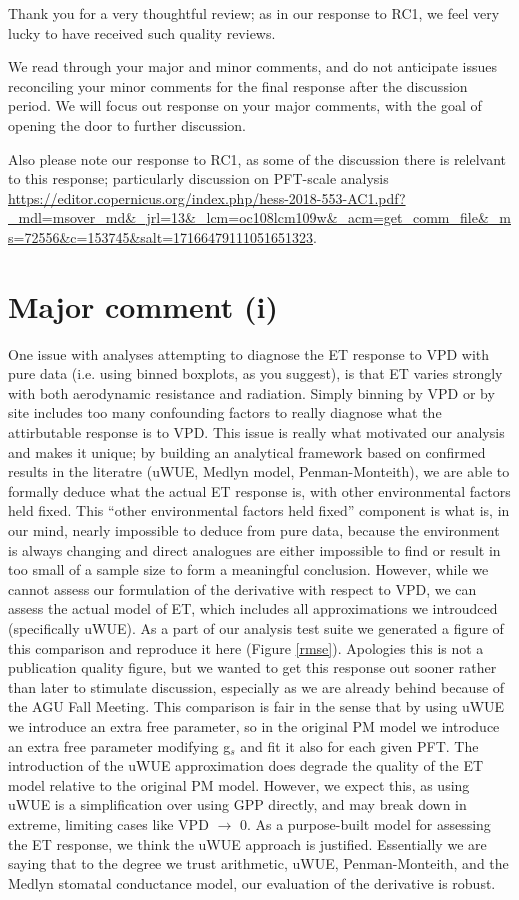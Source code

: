 \documentclass[12pt]{article}
\begin{document}
Thank you for a very thoughtful review; as in our response to RC1, we
feel very lucky to have received such quality reviews.

We read through your major and minor comments, and do not anticipate
issues reconciling your minor comments for the final response after
the discussion period. We will focus out response on your major
comments, with the goal of opening the door to further discussion.

Also please note our response to RC1, as some of the discussion there
is relelvant to this response; particularly discussion on PFT-scale
analysis \url{https://editor.copernicus.org/index.php/hess-2018-553-AC1.pdf?_mdl=msover_md&_jrl=13&_lcm=oc108lcm109w&_acm=get_comm_file&_ms=72556&c=153745&salt=17166479111051651323}.

\section{Major comment (i)}

One issue with analyses attempting to diagnose the ET response to VPD
with pure data (i.e. using binned boxplots, as you suggest), is that
ET varies strongly with both aerodynamic resistance and
radiation. Simply binning by VPD or by site includes too many
confounding factors to really diagnose what the attirbutable response
is to VPD. This issue is really what motivated our analysis and makes
it unique; by building an analytical framework based on confirmed
results in the literatre (uWUE, Medlyn model, Penman-Monteith), we are
able to formally deduce what the actual ET response is, with other
environmental factors held fixed. This ``other environmental factors
held fixed'' component is what is, in our mind, nearly impossible to
deduce from pure data, because the environment is always changing and
direct analogues are either impossible to find or result in too small
of a sample size to form a meaningful conclusion. However, while we
cannot assess our formulation of the derivative with respect to VPD,
we can assess the actual model of ET, which includes all
approximations we introudced (specifically uWUE). As a part of our
analysis test suite we generated a figure of this comparison and
reproduce it here (Figure \ref{rmse}). Apologies this is not a
publication quality figure, but we wanted to get this response out
sooner rather than later to stimulate discussion, especially as we are
already behind because of the AGU Fall Meeting. This comparison is
fair in the sense that by using uWUE we introduce an extra free
parameter, so in the original PM model we introduce an extra free
parameter modifying g$_s$ and fit it also for each given PFT. The
introduction of the uWUE approximation does degrade the quality of the
ET model relative to the original PM model. However, we expect this,
as using uWUE is a simplification over using GPP directly, and may
break down in extreme, limiting cases like VPD $\to$ 0. As
a purpose-built model for assessing the ET response, we think the uWUE
approach is justified. Essentially we are saying that to the degree we
trust arithmetic, uWUE, Penman-Monteith, and the Medlyn stomatal
conductance model, our evaluation of the derivative is robust.
\end{document}
